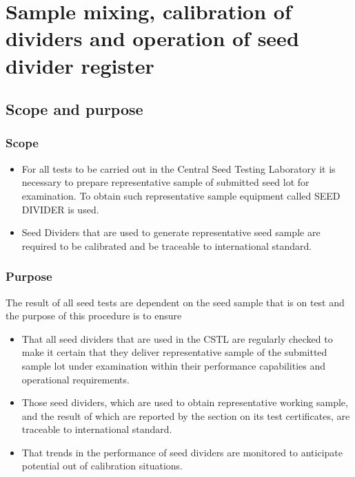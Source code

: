 \documentclass[]{book}
\providecommand{\tightlist}{%
  \setlength{\itemsep}{0pt}\setlength{\parskip}{0pt}}
\begin{document}
\chapter{Sample mixing, calibration of dividers and operation of seed
divider
register}\label{sample-mixing-calibration-of-dividers-and-operation-of-seed-divider-register}

\section{Scope and purpose}\label{scope-and-purpose-4}

\subsection{Scope}\label{scope-4}

\begin{itemize}
\item
  For all tests to be carried out in the Central Seed Testing Laboratory
  it is necessary to prepare representative sample of submitted seed lot
  for examination. To obtain such representative sample equipment called
  SEED DIVIDER is used.
\item
  Seed Dividers that are used to generate representative seed sample are
  required to be calibrated and be traceable to international standard.
\end{itemize}

\subsection{Purpose}\label{purpose-2}

The result of all seed tests are dependent on the seed sample that is on
test and the purpose of this procedure is to ensure

\begin{itemize}
\tightlist
\item
  That all seed dividers that are used in the CSTL are regularly checked
  to make it certain that they deliver representative sample of the
  submitted sample lot under examination within their performance
  capabilities and operational requirements.
\item
  Those seed dividers, which are used to obtain representative working
  sample, and the result of which are reported by the section on its
  test certificates, are traceable to international standard.
\item
  That trends in the performance of seed dividers are monitored to
  anticipate potential out of calibration situations.
\end{itemize}
\end{document}
